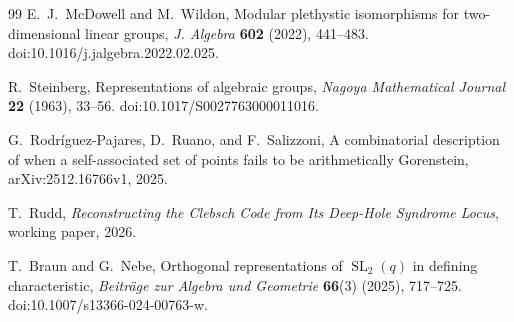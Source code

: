 \documentclass[11pt]{article}
\theoremstyle{definition}
\theoremstyle{remark}
\begin{document}
\begin{thebibliography}{99}
E.~J.~McDowell and M.~Wildon,
\newblock Modular plethystic isomorphisms for two-dimensional linear groups,
\newblock \emph{J. Algebra} \textbf{602} (2022), 441--483.
\newblock doi:10.1016/j.jalgebra.2022.02.025.

R.~Steinberg,
\newblock Representations of algebraic groups,
\newblock \emph{Nagoya Mathematical Journal} \textbf{22} (1963), 33--56.
\newblock doi:10.1017/S0027763000011016.

G.~Rodr\'iguez-Pajares, D.~Ruano, and F.~Salizzoni,
\newblock A combinatorial description of when a self-associated set of
points fails to be arithmetically Gorenstein,
\newblock arXiv:2512.16766v1, 2025.

T.~Rudd,
\newblock \emph{Reconstructing the Clebsch Code from Its Deep-Hole Syndrome Locus},
\newblock working paper, 2026.

T.~Braun and G.~Nebe,
\newblock Orthogonal representations of \(\operatorname{SL}_2(q)\) in
defining characteristic,
\newblock \emph{Beitr\"age zur Algebra und Geometrie} \textbf{66}(3)
(2025), 717--725.
\newblock doi:10.1007/s13366-024-00763-w.

\end{thebibliography}
\end{document}
